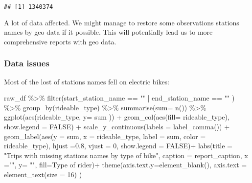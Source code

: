 \documentclass[
]{article}
\newenvironment{Shaded}{\begin{snugshade}}{\end{snugshade}}
\newcommand{\AttributeTok}[1]{\textcolor[rgb]{0.77,0.63,0.00}{#1}}
\newcommand{\ConstantTok}[1]{\textcolor[rgb]{0.00,0.00,0.00}{#1}}
\newcommand{\DecValTok}[1]{\textcolor[rgb]{0.00,0.00,0.81}{#1}}
\newcommand{\FloatTok}[1]{\textcolor[rgb]{0.00,0.00,0.81}{#1}}
\newcommand{\FunctionTok}[1]{\textcolor[rgb]{0.00,0.00,0.00}{#1}}
\newcommand{\NormalTok}[1]{#1}
\newcommand{\SpecialCharTok}[1]{\textcolor[rgb]{0.00,0.00,0.00}{#1}}
\newcommand{\StringTok}[1]{\textcolor[rgb]{0.31,0.60,0.02}{#1}}
\begin{document}
\begin{verbatim}
## [1] 1340374
\end{verbatim}

A lot of data affected. We might manage to restore some observations
stations names by geo data if it possible. This will potentially lead us
to more comprehensive reports with geo data.\\

\hypertarget{data-issues}{%
\subsubsection{Data issues}\label{data-issues}}

Most of the lost of stations names fell on electric bikes:

\begin{Shaded}
\begin{Highlighting}[]
\NormalTok{raw\_df }\SpecialCharTok{\%\textgreater{}\%} 
  \FunctionTok{filter}\NormalTok{(start\_station\_name }\SpecialCharTok{==} \StringTok{""} \SpecialCharTok{|}
\NormalTok{           end\_station\_name }\SpecialCharTok{==} \StringTok{""}\NormalTok{ ) }\SpecialCharTok{\%\textgreater{}\%}
  \FunctionTok{group\_by}\NormalTok{(rideable\_type) }\SpecialCharTok{\%\textgreater{}\%} 
  \FunctionTok{summarise}\NormalTok{(}\AttributeTok{sum=} \FunctionTok{n}\NormalTok{()) }\SpecialCharTok{\%\textgreater{}\%}
  \FunctionTok{ggplot}\NormalTok{(}\FunctionTok{aes}\NormalTok{(rideable\_type, }\AttributeTok{y=}\NormalTok{ sum )) }\SpecialCharTok{+}
  \FunctionTok{geom\_col}\NormalTok{(}\FunctionTok{aes}\NormalTok{(}\AttributeTok{fill=}\NormalTok{ rideable\_type), }\AttributeTok{show.legend =} \ConstantTok{FALSE}\NormalTok{) }\SpecialCharTok{+}
  \FunctionTok{scale\_y\_continuous}\NormalTok{(}\AttributeTok{labels =} \FunctionTok{label\_comma}\NormalTok{()) }\SpecialCharTok{+}
  \FunctionTok{geom\_label}\NormalTok{(}\FunctionTok{aes}\NormalTok{(}\AttributeTok{y =}\NormalTok{ sum, }\AttributeTok{x =}\NormalTok{ rideable\_type, }\AttributeTok{label =}\NormalTok{ sum,}
               \AttributeTok{color =}\NormalTok{ rideable\_type), }\AttributeTok{hjust =}\FloatTok{0.8}\NormalTok{, }\AttributeTok{vjust =} \DecValTok{0}\NormalTok{, }\AttributeTok{show.legend =} \ConstantTok{FALSE}\NormalTok{)}\SpecialCharTok{+}
  \FunctionTok{labs}\NormalTok{(}\AttributeTok{title =} \StringTok{"Trips with missing station\textquotesingle{}s names by type of bike"}\NormalTok{,}
       \AttributeTok{caption =}\NormalTok{ report\_caption,}
       \AttributeTok{x =}\StringTok{""}\NormalTok{, }\AttributeTok{y=} \StringTok{""}\NormalTok{,}
       \AttributeTok{fill=}\StringTok{\textquotesingle{}Type of rider\textquotesingle{}}\NormalTok{)}\SpecialCharTok{+}
  \FunctionTok{theme}\NormalTok{(}\AttributeTok{axis.text.y=}\FunctionTok{element\_blank}\NormalTok{(),}
        \AttributeTok{axis.text =} \FunctionTok{element\_text}\NormalTok{(}\AttributeTok{size =} \DecValTok{16}\NormalTok{) ) }
\end{Highlighting}
\end{Shaded}
\end{document}
